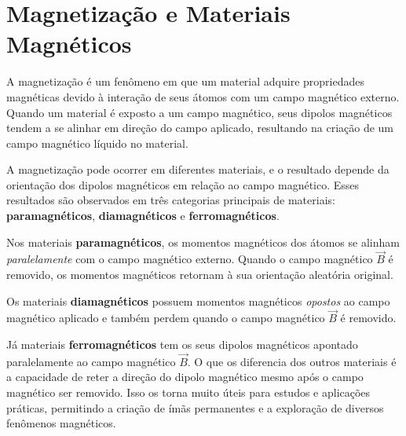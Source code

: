 \newpage\section{Magnetização e Materiais Magnéticos}A magnetização é um fenômeno em que um material adquire propriedades magnéticas devido à interação de seus átomos com um campo magnético externo. Quando um material é exposto a um campo magnético, seus dipolos magnéticos tendem a se alinhar em direção do campo aplicado, resultando na criação de um campo magnético líquido no material.

A magnetização pode ocorrer em diferentes materiais, e o resultado depende da orientação dos dipolos magnéticos em relação ao campo magnético. Esses resultados são observados em três categorias principais de materiais: \textbf{paramagnéticos}, \textbf{diamagnéticos} e \textbf{ferromagnéticos}.



Nos materiais \textbf{paramagnéticos}, os momentos magnéticos dos átomos se alinham \textit{paralelamente} com o campo magnético externo. Quando o campo magnético \textbf{$\vec{B}$} é removido, os momentos magnéticos retornam à sua orientação aleatória original. 

Os materiais \textbf{diamagnéticos} possuem momentos magnéticos \textit{opostos} ao campo magnético aplicado e também perdem quando o campo magnético \textbf{$\vec{B}$} é removido. 

Já materiais \textbf{ferromagnéticos} tem os seus dipolos magnéticos apontado paralelamente ao campo magnético \textbf{$\vec{B}$}. O que os diferencia dos outros materiais é a capacidade de reter a direção do dipolo magnético mesmo após o campo magnético ser removido. Isso os torna muito úteis para estudos e aplicações práticas, permitindo a criação de ímãs permanentes e a exploração de diversos fenômenos magnéticos.

